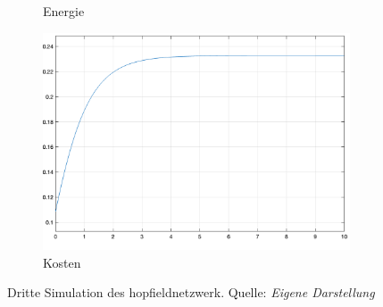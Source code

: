 \begin{figure}[h]
\begin{subfigure}[b]{0.32\textwidth}
    \caption{Energie}
  \end{subfigure}%
  \hfill
  \begin{subfigure}[b]{0.32\textwidth}
    \includegraphics[width=\textwidth]{abbildungen/hnn_simulation_3_kostenfunktion.png}
    \caption{Kosten}
  \end{subfigure}
  \caption{Dritte Simulation des \gls{hopfieldnetzwerk}. Quelle: \textit{Eigene Darstellung}}
  \label{fig:Simulation HNN 3}
\end{figure}
